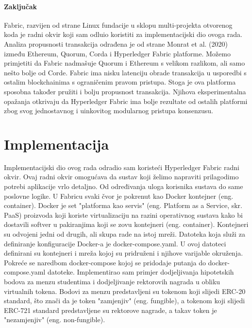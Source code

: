 \documentclass[times, utf8, diplomski]{fer}
\begin{document}
\subsubsection{Zaključak}

Fabric, razvijen od strane Linux fundacije u sklopu multi-projekta otvorenog koda je radni okvir koji sam odluio koristiti za implementacijski dio ovoga rada. Analiza propusnosti transakcija odrađena je od strane Monrat et al. (2020) između Ethereum, Quorum, Corda i Hyperledger Fabric platforme. Možemo primjetiti da Fabric nadmašuje Quorum i Ethereum s velikom razlikom, ali samo nešto bolje od Corde. Fabric ima nisku latenciju obrade transakcija u usporedbi s ostalim blockchainima s ograničenim pravom pristupa. Stoga je ova platforma sposobna također pružiti i bolju propusnost transakcija. Njihova eksperimentalna opažanja otkrivaju da Hyperledger Fabric ima bolje rezultate od ostalih platformi zbog svog jednostavnog i uinkovitog modularnog pristupa konsenzusu.

\chapter{Implementacija}
Implementacijski dio ovog rada odradio sam koristeći Hyperledger Fabric radni okvir.  Ovaj radni okvir omogućava da sustav koji želimo napraviti prilagodimo potrebi aplikacije vrlo detaljno. Od određivanja uloga korisnika sustava do same poslovne logike. U Fabricu svaki čvor je pokrenut kao Docker kontejner (eng. container). Docker je set "platforma kao servis" (eng. Platform as a Service, skr. PaaS) proizvoda koji koriste virtualizaciju na razini operativnog sustava kako bi dostavili softver u pakiranjima koji se zovu kontejneri (eng. container). Kontejneri su odvojeni jedni od drugih, ali skupa rade na istoj mreži. Datoteka koja služi za definiranje konfiguracije Docker-a je docker-compose.yaml. U ovoj datoteci definirani su kontejneri i mreža kojoj su pridruženi i njihove varijable okruženja. Pokreće se naredbom docker-compose kojoj se pridodaje putanja do docker-compose.yaml datoteke.
Implementirao sam primjer dodjeljivanja hipotetskih bodova za menzu studentima i dodjeljivanje rektorovih nagrada u obliku virtualnih tokena. Bodovi za menzu predstavljeni su tokenom koji slijedi ERC-20 standard, što znači da je token "zamjenjiv" (eng. fungible), a tokenom koji slijedi ERC-721 standard predstavljene su rektorove nagrade, a takav token je "nezamjenjiv" (eng. non-fungible).

\end{document}
